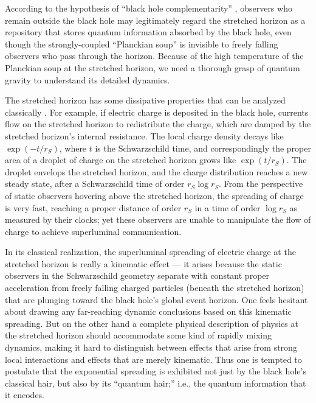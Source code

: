\documentclass[11pt]{article}
\begin{document}
According to the hypothesis of ``black hole complementarity'' \cite{complement,susskind-book}, observers who remain outside the black hole may legitimately regard the stretched horizon as a repository that stores quantum information absorbed by the black hole, even though the strongly-coupled ``Planckian soup'' is invisible to freely falling observers who pass through the horizon. Because of the high temperature of the Planckian soup at the stretched horizon, we need a thorough grasp of quantum gravity to understand its detailed dynamics. 

The stretched horizon has some dissipative properties that can be analyzed classically \cite{membrane}. For example, if electric charge is deposited in the black hole, currents flow on the stretched horizon to redistribute the charge, which are damped by the stretched horizon's internal resistance. The local charge density decays like $\exp(-t/r_S)$, where $t$ is the Schwarzschild time, and correspondingly the proper area of a droplet of charge on the stretched horizon grows like $\exp(t/r_S)$. The droplet envelops the stretched horizon, and the charge distribution reaches a new steady state, after a Schwarzschild time of order $r_S\log r_S$. From the perspective of static observers hovering above the stretched horizon, the spreading of charge is very fast, reaching a proper distance of order $r_S$ in a time of order $\log r_S$ as measured by their clocks; yet these observers are unable to manipulate the flow of charge to achieve superluminal communication.

In its classical realization, the superluminal spreading of electric charge at the stretched horizon is really a kinematic effect --- it arises because the static observers in the Schwarzschild geometry separate with constant proper acceleration from freely falling charged particles (beneath the stretched horizon) that are plunging toward the black hole's global event horizon. One feels hesitant about drawing any far-reaching dynamic conclusions based on this kinematic spreading. But on the other hand a complete physical description of physics at the stretched horizon should accommodate some kind of rapidly mixing dynamics, making it hard to distinguish between effects that arise from strong local interactions and effects that are merely kinematic. Thus one is tempted to postulate that the exponential spreading is exhibited not just by the black hole's classical hair, but also by its ``quantum hair;''  i.e., the quantum information that it encodes. 
\end{document}
